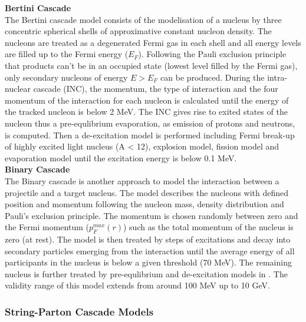 \textbf{Bertini Cascade}\\

The Bertini cascade model \cite{Heikkinen2003} consists of the modelisation of a nucleus by three concentric spherical shells of approximative constant nucleon density. The nucleons are treated as a degenerated Fermi gas in each shell and all energy levels are filled up to the Fermi energy ($E_F$). Following the Pauli exclusion principle that products can't be in an occupied state (lowest level filled by the Fermi gas), only secondary nucleons of energy $E > E_F$ can be produced. During the intra-nuclear cascade (INC), the momentum, the type of interaction and the four momentum of the interaction for each nucleon is calculated until the energy of the tracked nucleon is below 2 MeV. The INC gives rise to exited states of the nucleon thus a pre-equlibrium evaporation, as emission of protons and neutrons, is computed. Then a de-excitation model is performed including Fermi break-up of highly excited light nucleus (A < 12), explosion model, fission model and evaporation model until the excitation energy is below 0.1 MeV.\\

\textbf{Binary Cascade}\\

The Binary cascade \cite{Folger2004} is another approach to model the interaction between a projectile and a target nucleus. The model describes the nucleons with defined position and momentum following the nucleon mass, density distribution and Pauli's exclusion principle. The momentum is chosen randomly between zero and the Fermi momentum ($p_{F}^{max}(r)$) such as the total momentum of the nucleus is zero (at rest). The model is then treated by steps of excitations and decay into secondary particles emerging from the interaction until the average energy of all participants in the nucleus is below a given threshold (70 MeV). The remaining nucleus is further treated by pre-equlibrium and de-excitation models in \geant. The validity range of this model extends from around 100 MeV up to 10 GeV.

\subsubsection{String-Parton Cascade Models}

